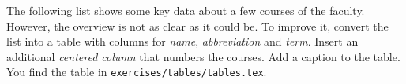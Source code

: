 The following list shows some key data about a few courses of the  faculty.
However, the overview is not as clear as it could be.
To improve it, convert the list into a table with columns for \emph{name}, \emph{abbreviation} and \emph{term}.
Insert an additional \emph{centered column} that numbers the courses. 
Add a caption to the table.
You find the table in \texttt{exercises/tables/tables.tex}.



